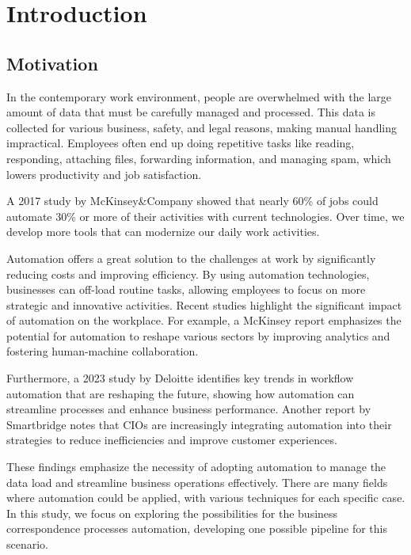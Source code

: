 
\chapter{Introduction}
\label{chp:intro}

\section{Motivation}
\label{sec:motivation}

 In the contemporary work environment, people are overwhelmed with the large amount of data that must be carefully managed and processed. This data is collected for various business, safety, and legal reasons, making manual handling impractical. Employees often end up doing repetitive tasks like reading, responding, attaching files, forwarding information, and managing spam, which lowers productivity and job satisfaction.
 
 A 2017 study by McKinsey\&Company\cite{Manyika2017} showed that nearly 60\% of jobs could automate 30\% or more of their activities with current technologies. Over time, we develop more tools that can modernize our daily work activities.
 
 Automation offers a great solution to the challenges at work by significantly reducing costs and improving efficiency. By using automation technologies, businesses can off-load routine tasks, allowing employees to focus on more strategic and innovative activities. Recent studies highlight the significant impact of automation on the workplace. For example, a McKinsey report\cite{Bughin2018} emphasizes the potential for automation to reshape various sectors by improving analytics and fostering human-machine collaboration.
 
 Furthermore, a 2023 study by Deloitte\cite{Deloitte2023} identifies key trends in workflow automation that are reshaping the future, showing how automation can streamline processes and enhance business performance. Another report by Smartbridge\cite{Smartbridge2023} notes that CIOs are increasingly integrating automation into their strategies to reduce inefficiencies and improve customer experiences.
 
 These findings emphasize the necessity of adopting automation to manage the data load and streamline business operations effectively. There are many fields where automation could be applied, with various techniques for each specific case. In 
 this study, we focus on exploring the possibilities for the business correspondence processes automation, developing one possible pipeline for this scenario.


